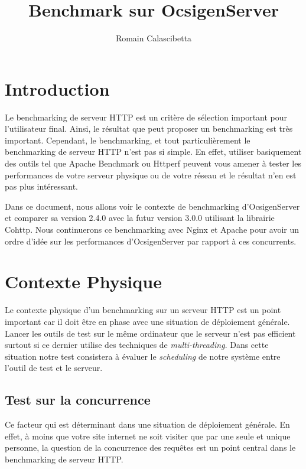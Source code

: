 \documentclass[a4paper, 11pt]{article}
\begin{document}
\title{Benchmark sur OcsigenServer}
\author{Romain Calascibetta}

\maketitle

\section{Introduction}

Le benchmarking de  serveur  HTTP  est  un  critère  de sélection important pour
l'utilisateur final.  Ainsi,  le résultat que  peut proposer un benchmarking est
très  important.   Cependant,  le  benchmarking,  et  tout  particulièrement  le
benchmarking  de  serveur  HTTP  n'est  pas  si  simple.   En  effet,   utiliser
basiquement des outils  tel que Apache Benchmark ou  Httperf peuvent vous amener
à tester  les performances de  votre serveur physique  ou de votre  réseau et le
résultat n'en est pas plus intéressant.

Dans ce document,  nous allons voir  le contexte de benchmarking d'OcsigenServer
et comparer sa version 2.4.0 avec  la futur version 3.0.0 utilisant la librairie
Cohttp.  Nous continuerons  ce benchmarking avec  Nginx et Apache  pour avoir un
ordre  d'idée   sur  les   performances  d'OcsigenServer   par  rapport   à  ces
concurrents.

\section{Contexte Physique}

Le  contexte  physique  d'un benchmarking  sur  un  serveur  HTTP  est  un point
important car il doit être en  phase avec une situation de déploiement générale.
Lancer les outils de  test  sur  le  même  ordinateur  que  le serveur n'est pas
efficient    surtout    si    ce    dernier    utilise    des    techniques   de
\emph{multi-threading}.  Dans cette situation notre test consistera à évaluer le
\emph{scheduling} de notre système entre l'outil de test et le serveur.

\subsection{Test sur la concurrence}

Ce facteur qui  est déterminant dans une situation  de déploiement générale.  En
effet,  à moins  que votre site  internet ne soit  visiter que par  une seule et
unique  personne,  la question  de la  concurrence  des  requêtes  est  un point
central dans le benchmarking de serveur HTTP.
\end{document}
